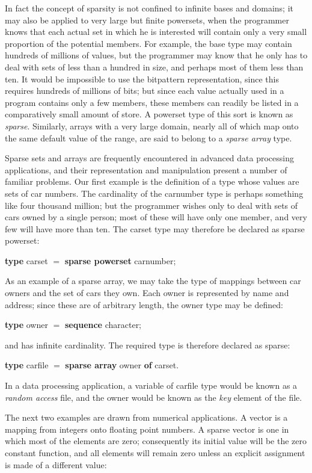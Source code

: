 \documentclass[twoside,11pt]{book}
\begin{document}
In fact the concept of sparsity is not confined to infinite bases and domains; it may also be applied to very large but finite powersets, when the programmer knows that each actual set in which he is interested will contain only a very small proportion of the potential members. For example, the base type may contain hundreds of millions of values, but the programmer may know that he only has to deal with sets of less than a hundred in size, and perhaps most of them less than ten. It would be impossible to use the bitpattern representation, since this requires hundreds of millions of bits; but since each value actually used in a program contains only a few members, these members can readily be listed in a comparatively small amount of store. A powerset type of this sort is known as \textit{sparse}. Similarly, arrays with a very large domain, nearly all of which map onto the same default value of the range, are said to belong to a \textit{sparse array} type.

Sparse sets and arrays are frequently encountered in advanced data processing applications, and their representation and manipulation present a number of familiar problems. Our first example is the definition of a type whose values are sets of car numbers. The cardinality of the carnumber type is perhaps something like four thousand million; but the programmer wishes only to deal with sets of cars owned by a single person; most of these will have only one member, and very few will have more than ten. The carset type may therefore be declared as sparse powerset:

\quad \textbf{type} carset $=$ \textbf{sparse powerset} carnumber;

As an example of a sparse array, we may take the type of mappings between car owners and the set of cars they own. Each owner is represented by name and address; since these are of arbitrary length, the owner type may be defined:

\quad \textbf{type} owner $=$ \textbf{sequence} character;

\noindent
and has infinite cardinality. The required type is therefore declared as sparse:

\quad \textbf{type} carfile $=$ \textbf{sparse array} owner \textbf{of} carset.

In a data processing application, a variable of carfile type would be known as a \textit{random access} file, and the owner would be known as the \textit{key} element of the file.

The next two examples are drawn from numerical applications. A vector is a mapping from integers onto floating point numbers. A sparse vector is one in which most of the elements are zero; consequently its initial value will be the zero constant function, and all elements will remain zero unless an explicit assignment is made of a different value:
\end{document}
